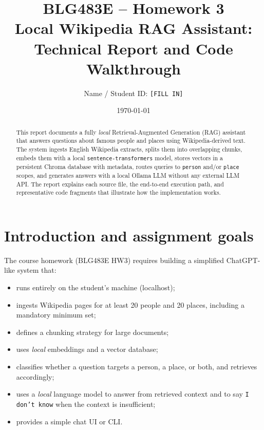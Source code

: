 \documentclass[11pt,a4paper]{article}
\title{\textbf{BLG483E -- Homework 3}\\[0.5em]
\Large Local Wikipedia RAG Assistant:\\
Technical Report and Code Walkthrough}
\author{Name / Student ID: \texttt{[FILL IN]}}
\date{\today}
\begin{document}
\maketitle

\begin{abstract}
This report documents a fully \emph{local} Retrieval-Augmented Generation (RAG) assistant
that answers questions about famous people and places using Wikipedia-derived text.
The system ingests English Wikipedia extracts, splits them into overlapping chunks,
embeds them with a local \texttt{sentence-transformers} model, stores vectors in a
persistent Chroma database with metadata, routes queries to \texttt{person} and/or
\texttt{place} scopes, and generates answers with a local Ollama LLM without any
external LLM API. The report explains each source file, the end-to-end execution path,
and representative code fragments that illustrate how the implementation works.
\end{abstract}

\tableofcontents
\newpage

\section{Introduction and assignment goals}

The course homework (BLG483E HW3) requires building a simplified ChatGPT-like system that:
\begin{itemize}[leftmargin=*]
  \item runs entirely on the student's machine (localhost);
  \item ingests Wikipedia pages for at least 20 people and 20 places, including a mandatory minimum set;
  \item defines a chunking strategy for large documents;
  \item uses \emph{local} embeddings and a vector database;
  \item classifies whether a question targets a person, a place, or both, and retrieves accordingly;
  \item uses a \emph{local} language model to answer from retrieved context and to say
        \texttt{I don't know} when the context is insufficient;
  \item provides a simple chat UI or CLI.
\end{itemize}
\end{document}
